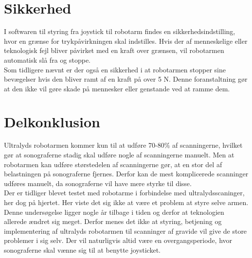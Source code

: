 \section{Sikkerhed}
I softwaren til styring fra joystick til robotarm findes en sikkerhedsindstilling, hvor en grænse for trykpåvirkningen skal indstilles. Hvis der af menneskelige eller teknologisk fejl bliver påvirket med en kraft over grænsen, vil robotarmen automatisk slå fra og stoppe. \\
Som tidligere nævnt er der også en sikkerhed i at robotarmen stopper sine bevægelser hvis den bliver ramt af en kraft på over 5 N. Denne foranstaltning gør at den ikke vil gøre skade på mennesker eller genstande ved at ramme dem. 

\section{Delkonklusion}
Ultralyds robotarmen kommer kun til at udføre 70-80\% af scanningerne, hvilket gør at sonograferne stadig skal udføre nogle af scanningerne manuelt. Men at robotarmen kan udføre størstedelen af scanningerne gør, at en stor del af belastningen på sonograferne fjernes. Derfor kan de mest komplicerede scanninger udføres manuelt, da sonograferne vil have mere styrke til disse.\\

Der er tidliger blevet testet med robotarme i forbindelse med ultralydsscaninger, her dog på hjertet. Her viste det sig ikke at være et problem at styre selve armen.  Denne undersøgelse ligger nogle år tilbage i tiden og derfor at teknologien allerede ændret sig meget. Derfor menes det ikke at styring, betjening og implementering af ultralyds robotarmen til scanninger af gravide vil give de store problemer i sig selv. Der vil naturligvis altid være en overgangsperiode, hvor sonograferne skal vænne sig til at benytte joysticket. 